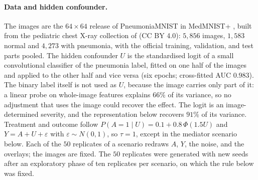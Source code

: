 \paragraph{Data and hidden confounder.} The images are the $64\times64$ release of PneumoniaMNIST in MedMNIST+ \citep{yang2023medmnist}, built from the pediatric chest X-ray collection of \citet{kermany2018identifying} (CC BY 4.0): $5{,}856$ images, $1{,}583$ normal and $4{,}273$ with pneumonia, with the official training, validation, and test parts pooled. The hidden confounder $U$ is the standardised logit of a small convolutional classifier of the pneumonia label, fitted on one half of the images and applied to the other half and vice versa (six epochs; cross-fitted AUC $0.983$). The binary label itself is not used as $U$, because the image carries only part of it: a linear probe on whole-image features explains $66\%$ of its variance, so no adjustment that uses the image could recover the effect. The logit is an image-determined severity, and the representation below recovers $91\%$ of its variance. Treatment and outcome follow $P(A=1\mid U)=0.1+0.8\,\Phi(1.5U)$ and $Y=A+U+\varepsilon$ with $\varepsilon\sim N(0,1)$, so $\tau=1$, except in the mediator scenario below. Each of the $50$ replicates of a scenario redraws $A$, $Y$, the noise, and the overlays; the images are fixed. The $50$ replicates were generated with new seeds after an exploratory phase of ten replicates per scenario, on which the rule below was fixed.

